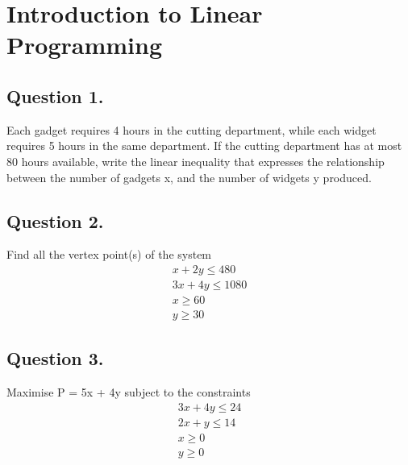 \documentclass[a4paper,12pt]{article}
\begin{document}
 \section*{Introduction to Linear Programming}
 	\subsection*{Question 1.} Each gadget requires 4 hours in the cutting department, while
 	each widget requires 5 hours in the same department. If the
 	cutting department has at most 80 hours available, write the linear inequality
 	that expresses the relationship between the number of gadgets x, and the number
 	of widgets y produced.
 	
 	\subsection*{Question 2.}  Find all the vertex point(s) of the system
 	\begin{eqnarray*}
 	x + 2y \leq 480 \\
 	3x + 4y \leq 1080 \\
 	x \geq 60 \\
 	y \geq 30
 	\end{eqnarray*}
 
 \subsection*{Question 3.}  Maximise P = 5x + 4y subject to the constraints
 \begin{eqnarray*}3x + 4y \leq 24 \\
 2x + y \leq 14 \\
 x \geq 0 \\
 y \geq 0 \end{eqnarray*}
\end{document}
